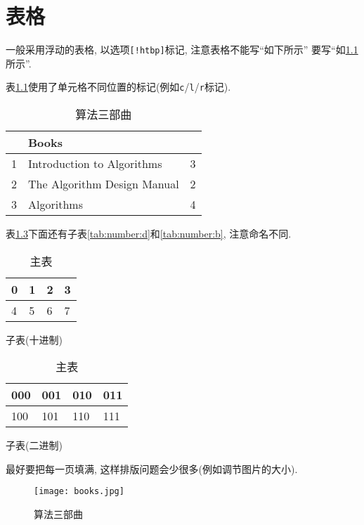 \chapter{表格}


  一般采用浮动的表格, 以选项\texttt{[!htbp]}标记, 注意表格不能写``如下所示''
要写``如\ref{tab:trilogy}所示''.


  表\ref{tab:trilogy}使用了单元格不同位置的标记(例如\texttt{c}/\texttt{l}/\texttt{r}标记).

\begin{table}[!hbtp]
\centering
\begin{tabular}{|c|l|r|}
\hline
    & Books                         &     \\ \hline
1   & Introduction to Algorithms    & 3 \\
2   & The Algorithm Design Manual   & 2 \\
3   & Algorithms                    & 4 \\
\hline
\end{tabular}
\caption{算法三部曲}
\label{tab:trilogy}
\end{table}


  表\ref{tab:number}下面还有子表\ref{tab:number:d}和\ref{tab:number:b}, 注意命名不同.

\begin{table}[!htb]
\centering
\begin{subtable}[t]{2in}
  \centering
  \begin{tabular}{|l|l|l|l|}
  \hline
  0 & 1 & 2 & 3 \\
  \hline
  4 & 5 & 6 & 7 \\
  \hline
  \end{tabular}
  \caption{子表(十进制)}\label{tab:number:d}
\end{subtable}
\quad
\begin{subtable}[t]{2in}
  \centering
  \begin{tabular}{|l|l|l|l|}
  \hline
  000 & 001 & 010 & 011 \\
  \hline
  100 & 101 & 110 & 111 \\
  \hline
  \end{tabular}
  \caption{子表(二进制)}\label{tab:number:b}
\end{subtable}
\caption{主表}
\label{tab:number}
\end{table}

最好要把每一页填满, 这样排版问题会少很多(例如调节图片的大小).

\begin{figure}[h]
    \centering
    \texttt{[image: books.jpg]}
    \caption{算法三部曲}
\end{figure}
